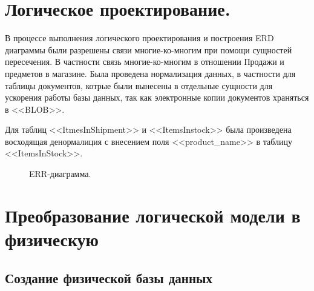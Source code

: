 \documentclass[14pt]{extreport}
\begin{document}
\chapter{Логическое проектирование.}
    В процессе выполнения логического проектирования и построения ERD диаграммы были разрешены связи многие-ко-многим при помощи %
    сущностей пересечения. В частности связь многие-ко-многим в отношении Продажи и предметов в магазине. Была проведена нормализация данных, в частности для%
    таблицы документов, котрые были вынесены в отдельные сущности для ускорения работы базы данных, так как электронные копии документов храняться в <<BLOB>>.

    Для таблиц <<ItmesInShipment>> и <<ItemsInstock>> была произведена восходящая денормалиция с внесением поля <<product\_name>> в таблицу <<ItemsInStock>>.


    
    
    \begin{figure}[H]%
        \centering
        \caption{ERR-диаграмма.}
        \label{ERR} 
       \end{figure}


\chapter{Преобразование логической модели в физическую}

\section{Создание физической базы данных}
\end{document}
